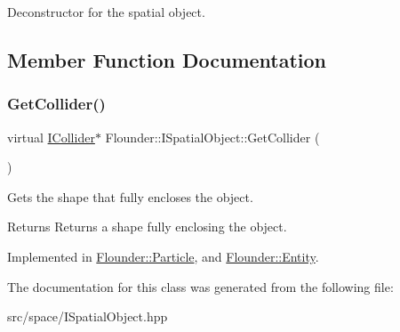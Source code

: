 Deconstructor for the spatial object. 



\subsection{Member Function Documentation}
\mbox{\label{class_flounder_1_1_i_spatial_object_ae1e28211dc94c4229baf284ea10ff556}} 
\subsubsection{\texorpdfstring{Get\+Collider()}{GetCollider()}}
{\footnotesize\ttfamily virtual \hyperlink{class_flounder_1_1_i_collider}{I\+Collider}$\ast$ Flounder\+::\+I\+Spatial\+Object\+::\+Get\+Collider (\begin{DoxyParamCaption}{ }\end{DoxyParamCaption})\hspace{0.3cm}{\ttfamily [pure virtual]}}



Gets the shape that fully encloses the object. 

\begin{DoxyReturn}{Returns}
Returns a shape fully enclosing the object. 
\end{DoxyReturn}


Implemented in \hyperlink{class_flounder_1_1_particle_aa27a3dd7197f5ce881a45414d8c19551}{Flounder\+::\+Particle}, and \hyperlink{class_flounder_1_1_entity_ae56c103b9af5861733701dca4f30cee9}{Flounder\+::\+Entity}.



The documentation for this class was generated from the following file\+:\begin{DoxyCompactItemize}
\item 
src/space/I\+Spatial\+Object.\+hpp\end{DoxyCompactItemize}
